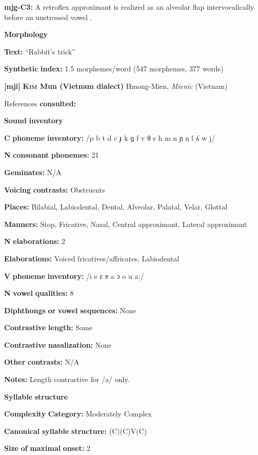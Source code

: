 \begin{styleBody}
\textbf{mjg-C3:} A retroflex approximant is realized as an alveolar flap intervocalically before an unstressed vowel \citep[31]{Slater2003}.

\textbf{Morphology}

\textbf{Text:} “Rabbit’s trick” \citep[343-350]{Slater2003}

\textbf{Synthetic} \textbf{index:} 1.5 morphemes/word (547 morphemes, 377 words)

\textbf{[mji]}   \textbf{\textsc{Kim} \textbf{Mun} \textbf{(Vietnam} \textbf{dialect)}}  Hmong-Mien, \textit{Mienic} (Vietnam)

References \textbf{consulted:} \citet{Clark2008}

\textbf{Sound} \textbf{inventory}

\textbf{C} \textbf{phoneme} \textbf{inventory:} /p b t d c ɟ k ɡ f v θ s h m n ɲ ŋ l ʎ w j/

\textbf{N} \textbf{consonant} \textbf{phonemes:} 21

\textbf{Geminates:} N/A

\textbf{Voicing} \textbf{contrasts:} Obstruents

\textbf{Places:} Bilabial, Labiodental, Dental, Alveolar, Palatal, Velar, Glottal

\textbf{Manners:} Stop, Fricative, Nasal, Central approximant, Lateral approximant

\textbf{N} \textbf{elaborations:} 2

\textbf{Elaborations:} Voiced fricatives/affricates, Labiodental

\textbf{V} \textbf{phoneme} \textbf{inventory:} /i e ɛ ɐ a ɔ o u aː/

\textbf{N} \textbf{vowel} \textbf{qualities:} 8

\textbf{Diphthongs} \textbf{or} \textbf{vowel} \textbf{sequences:} None

\textbf{Contrastive} \textbf{length:} Some

\textbf{Contrastive} \textbf{nasalization:} None

\textbf{Other} \textbf{contrasts:} N/A

\textbf{Notes:} Length contrastive for /a/ only.

\textbf{Syllable} \textbf{structure}

\textbf{Complexity} \textbf{Category:} Moderately Complex

\textbf{Canonical} \textbf{syllable} \textbf{structure:} (C)(C)V(C) \citep[123-7]{Clark2008}

\textbf{Size} \textbf{of} \textbf{maximal} \textbf{onset:} 2


\end{styleBody}
